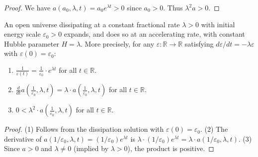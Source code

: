 \begin{proof}
We have $a(a_0, \lambda, t) = a_0 e^{\lambda t} > 0$ since $a_0 > 0$. Thus $\lambda^2 a > 0$.
\end{proof}

\begin{theorem}
An open universe dissipating at a constant fractional rate $\lambda > 0$ with initial energy scale $\varepsilon_0 > 0$ expands, and does so at an accelerating rate, with constant Hubble parameter $H = \lambda$. More precisely, for any $\varepsilon : \mathbb{R} \to \mathbb{R}$ satisfying $d\varepsilon/dt = -\lambda \varepsilon$ with $\varepsilon(0) = \varepsilon_0$:
\begin{enumerate}
\item $\displaystyle \frac{1}{\varepsilon(t)} = \frac{1}{\varepsilon_0} \cdot e^{\lambda t}$ for all $t \in \mathbb{R}$.
\item $\displaystyle \frac{d}{dt} a\left(\frac{1}{\varepsilon_0}, \lambda, t\right) = \lambda \cdot a\left(\frac{1}{\varepsilon_0}, \lambda, t\right)$ for all $t \in \mathbb{R}$.
\item $\displaystyle 0 < \lambda^2 \cdot a\left(\frac{1}{\varepsilon_0}, \lambda, t\right)$ for all $t \in \mathbb{R}$.
\end{enumerate}
\end{theorem}

\begin{proof}
(1) Follows from the dissipation solution with $\varepsilon(0) = \varepsilon_0$.
(2) The derivative of $a(1/\varepsilon_0, \lambda, t) = (1/\varepsilon_0) e^{\lambda t}$ is $\lambda \cdot (1/\varepsilon_0) e^{\lambda t} = \lambda \cdot a(1/\varepsilon_0, \lambda, t)$.
(3) Since $a > 0$ and $\lambda \neq 0$ (implied by $\lambda > 0$), the product is positive.
\end{proof}


